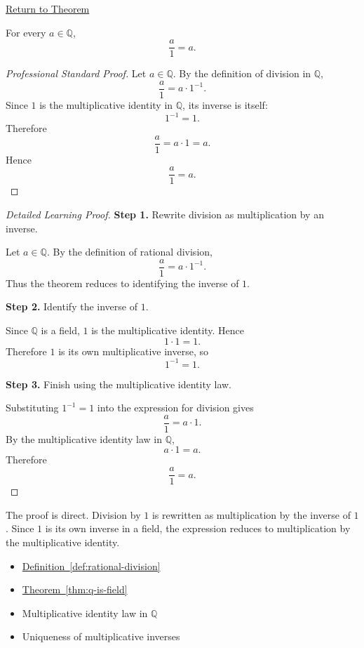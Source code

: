 \newpage
{}
\label{prf:rational-division-by-one}

\begin{remark*}[Return]
\hyperref[thm:rational-division-by-one]{Return to Theorem}
\end{remark*}

\begin{theorem*}
For every $a\in\mathbb{Q}$,
\[
\frac{a}{1}=a.
\]
\end{theorem*}

\begin{proof}[Professional Standard Proof]
\LRAProofBodyStart
Let $a\in\mathbb{Q}$. By the definition of division in $\mathbb{Q}$,
\[
\frac{a}{1}=a\cdot 1^{-1}.
\]
Since $1$ is the multiplicative identity in $\mathbb{Q}$, its inverse is
itself:
\[
1^{-1}=1.
\]
Therefore
\[
\frac{a}{1}=a\cdot 1=a.
\]
Hence
\[
\frac{a}{1}=a.
\]
\end{proof}

\begin{proof}[Detailed Learning Proof]
\LRAProofBodyStart

\textbf{Step 1.} Rewrite division as multiplication by an inverse.

Let $a\in\mathbb{Q}$. By the definition of rational division,
\[
\frac{a}{1}=a\cdot 1^{-1}.
\]
Thus the theorem reduces to identifying the inverse of $1$.

\textbf{Step 2.} Identify the inverse of $1$.

Since $\mathbb{Q}$ is a field, $1$ is the multiplicative identity. Hence
\[
1\cdot 1=1.
\]
Therefore $1$ is its own multiplicative inverse, so
\[
1^{-1}=1.
\]

\textbf{Step 3.} Finish using the multiplicative identity law.

Substituting $1^{-1}=1$ into the expression for division gives
\[
\frac{a}{1}=a\cdot 1.
\]
By the multiplicative identity law in $\mathbb{Q}$,
\[
a\cdot 1=a.
\]
Therefore
\[
\frac{a}{1}=a.
\]
\end{proof}

\begin{remark*}
The proof is direct. Division by $1$ is rewritten as multiplication by
the inverse of $1$. Since $1$ is its own inverse in a field, the expression
reduces to multiplication by the multiplicative identity.
\end{remark*}

\begin{dependencies}
\begin{itemize}
  \item \hyperref[def:rational-division]{Definition~\ref*{def:rational-division}}
  \item \hyperref[thm:q-is-field]{Theorem~\ref*{thm:q-is-field}}
  \item Multiplicative identity law in $\mathbb{Q}$
  \item Uniqueness of multiplicative inverses
\end{itemize}
\end{dependencies}

\clearpage
